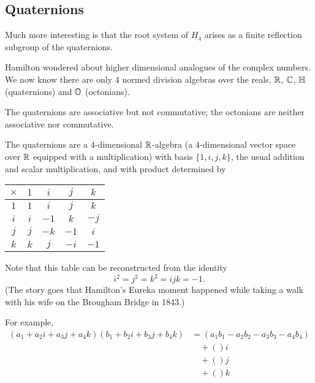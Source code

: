 \subsection{Quaternions}

Much more interesting is that the root system of $H_4$ arises as a finite
reflection subgroup of the quaternions.

Hamilton wondered about higher dimensional analogues of the complex numbers.
We now know there are only 4 normed division algebras over the reals, $\mathbb{R}$,
$\mathbb{C}$, $\mathbb{H}$ (quaternions) and $\mathbb{O}$ (octonians).

The quaternions are associative but not commutative; the octonians are neither
associative nor commutative.

The quaternions are a 4-dimensional $\mathbb{R}$-algebra (a 4-dimensional vector space
over $\mathbb{R}$ equipped with a multiplication) with basis $\{1, i, j, k\}$, the
usual addition and scalar multiplication, and with product determined by

\begin{tabular}{c|cccc}
$\times$ & $1$ & $i$ & $j$ & $k$ \\
\hline
$1$ & $1$ & $i$ & $j$ & $k$ \\
$i$ & $i$ & $-1$ & $k$ & $-j$ \\
$j$ & $j$ & $-k$ & $-1$ & $i$ \\
$k$ & $k$ & $j$ & $-i$ & $-1$
\end{tabular}

Note that this table can be reconstructed from the identity
\[
    i^2 = j^2 = k^2 = ijk = -1.
\]
(The story goes that Hamilton's Eureka moment happened while taking a walk with
his wife on the Brougham Bridge in 1843.)

For example, %
\begin{align*}
    (a_1 + a_2 i + a_3 j + a_4 k)(b_1 + b_2 i + b_3 j + b_4 k)
    &= (a_1 b_1 - a_2 b_2 - a_3 b_3 - a_4 b_4) \\
    & \quad + ()i \\
    & \quad + ()j \\
    & \quad + ()k
\end{align*}

